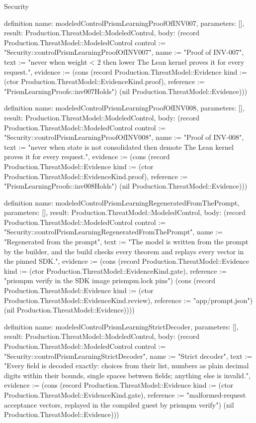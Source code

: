 \begin{lexlean}{Security}
\begin{semanticmodule}
definition{
  name: modeledControlPrismLearningProofOfINV007,
  parameters: [],
  result: Production.ThreatModel::ModeledControl,
  body: (record Production.ThreatModel::ModeledControl {control := "Security::controlPrismLearningProofOfINV007", name := "Proof of INV-007", text := "never when weight < 2 then lower The Lean kernel proves it for every request.", evidence := (cons (record Production.ThreatModel::Evidence {kind := (ctor Production.ThreatModel::EvidenceKind.proof), reference := "PrismLearningProofs::inv007Holds"}) (nil Production.ThreatModel::Evidence))})
}

definition{
  name: modeledControlPrismLearningProofOfINV008,
  parameters: [],
  result: Production.ThreatModel::ModeledControl,
  body: (record Production.ThreatModel::ModeledControl {control := "Security::controlPrismLearningProofOfINV008", name := "Proof of INV-008", text := "never when state is not consolidated then demote The Lean kernel proves it for every request.", evidence := (cons (record Production.ThreatModel::Evidence {kind := (ctor Production.ThreatModel::EvidenceKind.proof), reference := "PrismLearningProofs::inv008Holds"}) (nil Production.ThreatModel::Evidence))})
}

definition{
  name: modeledControlPrismLearningRegeneratedFromThePrompt,
  parameters: [],
  result: Production.ThreatModel::ModeledControl,
  body: (record Production.ThreatModel::ModeledControl {control := "Security::controlPrismLearningRegeneratedFromThePrompt", name := "Regenerated from the prompt", text := "The model is written from the prompt by the builder, and the build checks every theorem and replays every vector in the pinned SDK.", evidence := (cons (record Production.ThreatModel::Evidence {kind := (ctor Production.ThreatModel::EvidenceKind.gate), reference := "prismpm verify in the SDK image prismpm.lock pins"}) (cons (record Production.ThreatModel::Evidence {kind := (ctor Production.ThreatModel::EvidenceKind.review), reference := "app/prompt.json"}) (nil Production.ThreatModel::Evidence)))})
}

definition{
  name: modeledControlPrismLearningStrictDecoder,
  parameters: [],
  result: Production.ThreatModel::ModeledControl,
  body: (record Production.ThreatModel::ModeledControl {control := "Security::controlPrismLearningStrictDecoder", name := "Strict decoder", text := "Every field is decoded exactly: choices from their list, numbers as plain decimal digits within their bounds, single spaces between fields; anything else is invalid.", evidence := (cons (record Production.ThreatModel::Evidence {kind := (ctor Production.ThreatModel::EvidenceKind.gate), reference := "malformed-request acceptance vectors, replayed in the compiled guest by prismpm verify"}) (nil Production.ThreatModel::Evidence))})
}


\end{semanticmodule}
\end{lexlean}
